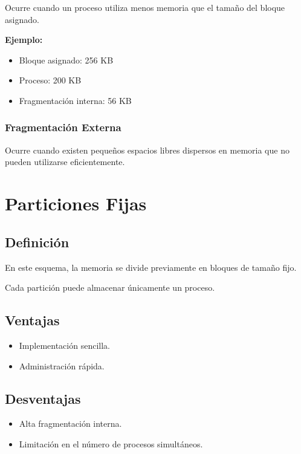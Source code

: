 Ocurre cuando un proceso utiliza menos memoria que el tamaño del bloque asignado.

\textbf{Ejemplo:}

\begin{itemize}
    \item Bloque asignado: 256 KB
    \item Proceso: 200 KB
    \item Fragmentación interna: 56 KB
\end{itemize}

\subsubsection{Fragmentación Externa}

Ocurre cuando existen pequeños espacios libres dispersos en memoria que no pueden utilizarse eficientemente.


\section{Particiones Fijas}

\subsection{Definición}

En este esquema, la memoria se divide previamente en bloques de tamaño fijo.

Cada partición puede almacenar únicamente un proceso.

\subsection{Ventajas}

\begin{itemize}
    \item Implementación sencilla.
    \item Administración rápida.
\end{itemize}

\subsection{Desventajas}

\begin{itemize}
    \item Alta fragmentación interna.
    \item Limitación en el número de procesos simultáneos.
\end{itemize}

